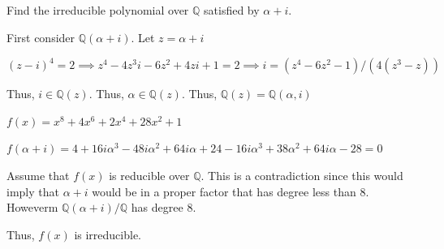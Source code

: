 \documentclass[12pt, letterpaper]{article}
\newcommand{\Q}{\mathbb{Q}}
\begin{document}
\begin{subproblem}{}
    Find the irreducible polynomial over $\Q$ satisfied by $\alpha + i$.
\end{subproblem}
\begin{problemproof}
    First consider $\Q(\alpha+i)$. Let $z=\alpha+i$

    $(z-i)^4=2 \implies z^4-4z^3i-6z^2+4zi+1=2 \implies i=(z^4-6z^2-1)/(4(z^3-z))$

    Thus, $i \in \Q(z)$. Thus, $\alpha \in \Q(z)$. Thus, $\Q(z)=\Q(\alpha,i)$

    $f(x)=x^8+4x^6+2x^4+28x^2+1$

    $f(\alpha+i)=4+16i\alpha^3-48i\alpha^2+64i\alpha+24-16i\alpha^3+38\alpha^2+64i\alpha-28=0$

    Assume that $f(x)$ is reducible over $\Q$. This is a contradiction since this would imply that $\alpha+i$ would be in a proper factor that has degree less than 8. Howeverm $\Q(\alpha+i)/\Q$ has degree $8$.

    Thus, $f(x)$ is irreducible.
\end{problemproof}
\end{document}
